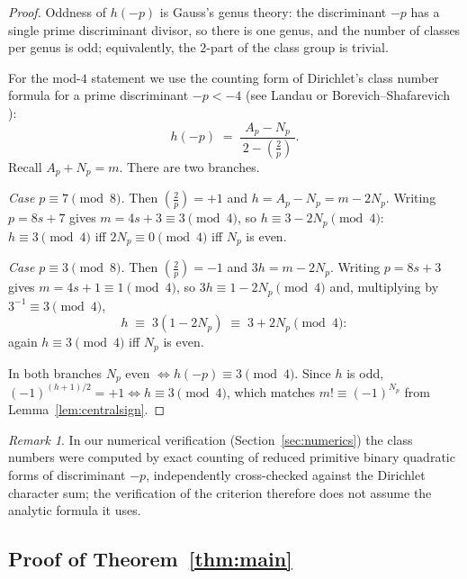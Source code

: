 \documentclass[11pt]{article}
\theoremstyle{definition}
\theoremstyle{remark}
\newtheorem{remark}[theorem]{Remark}
\newcommand{\legendre}[2]{\left(\tfrac{#1}{#2}\right)}
\begin{document}
\begin{proof}
Oddness of $h(-p)$ is Gauss's genus theory: the discriminant $-p$ has a
single prime discriminant divisor, so there is one genus, and the number of
classes per genus is odd; equivalently, the $2$-part of the class group is
trivial.

For the mod-$4$ statement we use the counting form of Dirichlet's class
number formula for a prime discriminant $-p < -4$ (see Landau
\cite{Landau} or Borevich--Shafarevich \cite{BS}):
\[
  h(-p) \;=\; \frac{A_p - N_p}{\,2 - \legendre{2}{p}\,} .
\]
Recall $A_p + N_p = m$. There are two branches.

\emph{Case $p \equiv 7 \pmod 8$.} Then $\legendre{2}{p} = +1$ and
$h = A_p - N_p = m - 2N_p$. Writing $p = 8s + 7$ gives $m = 4s + 3 \equiv 3
\pmod 4$, so $h \equiv 3 - 2N_p \pmod 4$: $h \equiv 3 \pmod 4$ iff
$2N_p \equiv 0 \pmod 4$ iff $N_p$ is even.

\emph{Case $p \equiv 3 \pmod 8$.} Then $\legendre{2}{p} = -1$ and
$3h = m - 2N_p$. Writing $p = 8s + 3$ gives $m = 4s + 1 \equiv 1 \pmod 4$,
so $3h \equiv 1 - 2N_p \pmod 4$ and, multiplying by $3^{-1} \equiv 3
\pmod 4$,
\[
  h \;\equiv\; 3(1 - 2N_p) \;\equiv\; 3 + 2N_p \pmod 4 :
\]
again $h \equiv 3 \pmod 4$ iff $N_p$ is even.

In both branches $N_p$ even $\iff h(-p) \equiv 3 \pmod 4$. Since $h$ is odd,
$(-1)^{(h+1)/2} = +1 \iff h \equiv 3 \pmod 4$, which matches
$m! \equiv (-1)^{N_p}$ from Lemma~\ref{lem:centralsign}.
\end{proof}

\begin{remark}
In our numerical verification (Section~\ref{sec:numerics}) the class numbers
were computed by exact counting of reduced primitive binary quadratic forms
of discriminant $-p$, independently cross-checked against the Dirichlet
character sum; the verification of the criterion therefore does not assume
the analytic formula it uses.
\end{remark}

\subsection{Proof of Theorem~\ref{thm:main}}
\end{document}
